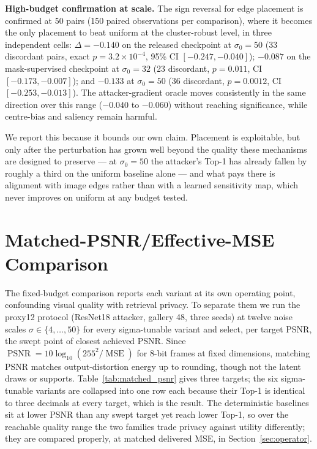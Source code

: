 \documentclass[10pt,journal]{IEEEtran}
\begin{document}
\textbf{High-budget confirmation at scale.} The sign reversal for edge
placement is confirmed at 50 pairs (150 paired observations per comparison),
where it becomes the only placement to beat uniform at the cluster-robust
level, in three independent cells: $\Delta=-0.140$ on the released checkpoint
at $\sigma_0=50$ (33 discordant pairs, exact $p=3.2\times10^{-4}$, 95\% CI
$[-0.247,-0.040]$); $-0.087$ on the mask-supervised checkpoint at
$\sigma_0=32$ (23 discordant, $p=0.011$, CI $[-0.173,-0.007]$); and $-0.133$
at $\sigma_0=50$ (36 discordant, $p=0.0012$, CI $[-0.253,-0.013]$). The
attacker-gradient oracle moves consistently in the same direction over this
range ($-0.040$ to $-0.060$) without reaching significance, while centre-bias
and saliency remain harmful.

We report this because it bounds our own claim. Placement is exploitable, but
only after the perturbation has grown well beyond the quality these mechanisms
are designed to preserve --- at $\sigma_0=50$ the attacker's Top-1 has already
fallen by roughly a third on the uniform baseline alone --- and what pays
there is alignment with image edges rather than with a learned sensitivity
map, which never improves on uniform at any budget tested.


\section{Matched-PSNR/Effective-MSE Comparison}
\label{sec:matched_psnr}

The fixed-budget comparison reports each variant at its own operating point,
confounding visual quality with retrieval privacy. To separate them we run the
proxy12 protocol (ResNet18 attacker, gallery 48, three seeds) at twelve noise
scales $\sigma\in\{4,\dots,50\}$ for every sigma-tunable variant and select,
per target PSNR, the swept point of closest achieved PSNR. Since
$\operatorname{PSNR}=10\log_{10}(255^2/\operatorname{MSE})$ for 8-bit frames
at fixed dimensions, matching PSNR matches output-distortion energy up to
rounding, though not the latent draws or supports. Table~\ref{tab:matched_psnr}
gives three targets; the six sigma-tunable variants are collapsed into one row
each because their Top-1 is identical to three decimals at every target, which
is the result. The deterministic baselines sit at lower PSNR than any swept
target yet reach lower Top-1, so over the reachable quality range the two
families trade privacy against utility differently; they are compared properly,
at matched delivered MSE, in Section~\ref{sec:operator}.
\end{document}
